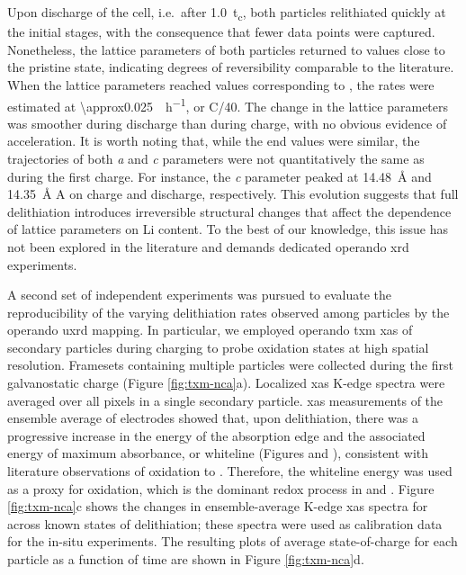 \documentclass{article}
\begin{document}
Upon discharge of the cell, i.e.\ after \SI{1.0}{t_c}, both particles
relithiated quickly at the initial stages, with the consequence that
fewer data points were captured. Nonetheless, the lattice parameters
of both particles returned to values close to the pristine state,
indicating degrees of reversibility comparable to the
literature\cite{robert2015}. When the lattice parameters reached
values corresponding to , the rates were estimated at
\SI{\approx0.025}{\per\hour}, or C/40. The change in the
lattice parameters was smoother during discharge than during charge,
with no obvious evidence of acceleration. It is worth noting that,
while the end values were similar, the trajectories of both \emph{a}
and \emph{c} parameters were not quantitatively the same as during the
first charge. For instance, the \emph{c} parameter peaked at
\SI{14.48}{\angstrom} and \SI{14.35}{\angstrom} A on charge and
discharge, respectively. This evolution suggests that full
delithiation introduces irreversible structural changes that affect
the dependence of lattice parameters on Li content. To the best of our
knowledge, this issue has not been explored in the literature and
demands dedicated operando \gls{xrd} experiments.




A second set of independent experiments was pursued to evaluate the
reproducibility of the varying delithiation rates observed among
particles by the operando \gls{uxrd} mapping. In particular, we
employed operando \Gls{txm} \gls{xas} of \nca{} secondary particles
during charging to probe  oxidation states at high spatial
resolution. Framesets containing multiple particles were collected
during the first galvanostatic charge (Figure
\ref{fig:txm-nca}a). Localized \gls{xas} K-edge spectra were averaged
over all pixels in a single secondary particle. \gls{xas} measurements
of the ensemble average of electrodes showed that, upon delithiation,
there was a progressive increase in the energy of the absorption edge
and the associated energy of maximum absorbance, or whiteline (Figures
 and ), consistent
with literature observations of  oxidation to
\cite{deb2005,muto2009}. Therefore, the whiteline energy
was used as a proxy for  oxidation, which is the dominant redox
process in \nca{} and \nmc{}. Figure \ref{fig:txm-nca}c shows the
changes in ensemble-average  K-edge \gls{xas} spectra for
\nca{} across known states of delithiation; these spectra were used as
calibration data for the in-situ experiments. The resulting plots of
average state-of-charge for each particle as a function of time are
shown in Figure \ref{fig:txm-nca}d.
\end{document}
